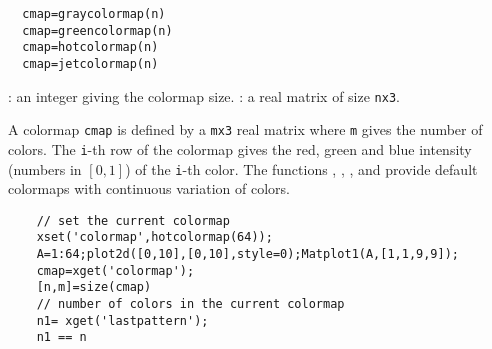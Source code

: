 \begin{mandesc}
  \\ %
  \\ %
  \\ %
  \\ %
  \\ %
\end{mandesc}
\begin{calling_sequence}
\begin{verbatim}
  cmap=graycolormap(n)
  cmap=greencolormap(n)
  cmap=hotcolormap(n)
  cmap=jetcolormap(n)
\end{verbatim}
\end{calling_sequence}
\begin{parameters}
  \begin{varlist}
    : an integer giving the colormap size.
    : a real matrix of size \verb!nx3!.
\end{varlist}
\end{parameters}
\begin{mandescription}
  A colormap \verb!cmap! is defined by a \verb!mx3! real matrix where \verb!m!
  gives the number of colors. The \verb!i!-th row of the colormap gives the
  red, green and blue intensity (numbers in $[0,1]$) of the \verb!i!-th color.
  The functions ,
  , ,
  and  provide default colormaps with
  continuous variation of colors.
\end{mandescription}
\begin{examples}
  \begin{Verbatim}
    // set the current colormap
    xset('colormap',hotcolormap(64));
    A=1:64;plot2d([0,10],[0,10],style=0);Matplot1(A,[1,1,9,9]);
    cmap=xget('colormap');
    [n,m]=size(cmap)
    // number of colors in the current colormap
    n1= xget('lastpattern');
    n1 == n
  \end{Verbatim}
\end{examples}
